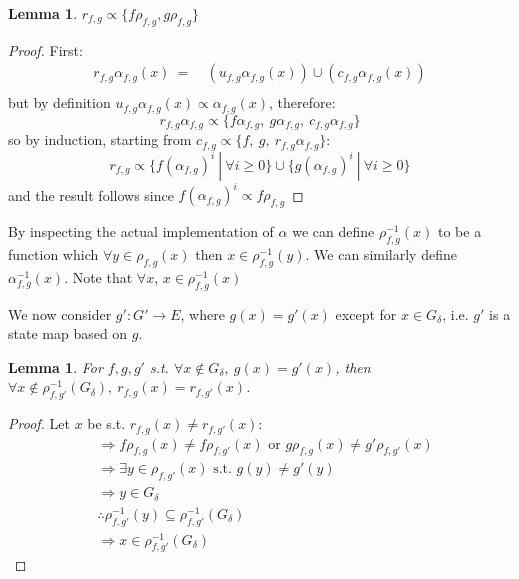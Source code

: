 \documentclass{article}
\newtheorem{lemma}[theorem]{Lemma}
\begin{document}
\begin{lemma}
	 $r_{f,g} \propto \{f\rho_{f,g}, g\rho_{f,g}\}$
\end{lemma}

\begin{proof}
	
	First:
	\[
		\begin{split}
		r_{f,g}\alpha_{f,g}(x)\ =\ & (u_{f,g}\alpha_{f,g}(x)) \cup (c_{f,g}\alpha_{f,g}(x))\\
		\end{split}
	\]\footnotemark but by definition $u_{f,g} \alpha_{f,g}(x) \propto \alpha_{f,g}(x)$, therefore:
	\[
		r_{f,g}\alpha_{f,g} \propto \{f\alpha_{f,g},\ g\alpha_{f,g},\ c_{f,g}\alpha_{f,g}\}
	\]
	so by induction, starting from $c_{f,g} \propto \{f,\ g,\ r_{f,g}\alpha_{f,g}\}$:
	\[
		r_{f,g} \propto \{ f(\alpha_{f,g})^i \ |\ \forall i \ge 0 \} \cup \{ g(\alpha_{f,g})^i \ |\ \forall i \ge 0 \}
	\]
    and the result follows since $f (\alpha_{f,g})^i \propto f \rho_{f,g}$
	
\end{proof}

By inspecting the actual implementation of $\alpha$ we can define $\rho_{f,g}^{-1}(x)$ to be a function which $\forall y \in \rho_{f,g}(x)$ then $x \in \rho_{f,g}^{-1}(y)$. We can similarly define $\alpha_{f,g}^{-1}(x)$. Note that $\forall x$, $x \in \rho_{f,g}^{-1}(x)$

We now consider $g': G' \rightarrow E$, where $g(x) = g'(x)$ except for $x \in G_\delta$, i.e. $g'$ is a state map based on $g$.

\begin{lemma}
	For $f, g, g'$ s.t. $\forall x \notin G_\delta,\ g(x) = g'(x)$, then $\forall x \notin \rho_{f,g'}^{-1}(G_\delta),\ r_{f,g}(x) = r_{f,g'}(x)$.
\end{lemma}

\begin{proof}
	Let $x$ be s.t. $r_{f,g}(x) \neq r_{f,g'}(x)$:
	\[
	\begin{split}
		&\Rightarrow f\rho_{f,g}(x) \neq f\rho_{f,g'}(x) \text{ or } g\rho_{f,g}(x) \neq g'\rho_{f,g'}(x)\\
		&\Rightarrow \exists y \in \rho_{f,g'}(x) \text{ s.t. } g(y) \neq g'(y)\\
		&\Rightarrow y \in G_\delta\\
		&\therefore \rho_{f,g'}^{-1}(y) \subseteq \rho_{f,g'}^{-1}(G_\delta)\\
		&\Rightarrow x \in \rho_{f,g'}^{-1}(G_\delta)
	\end{split}
	\]
\end{proof}
\end{document}
